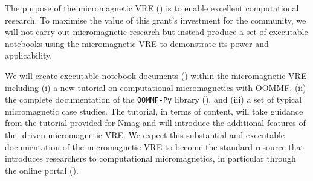 \begin{workpackage}
\begin{tasklist}
\begin{task}[lead=USO,title=Demonstrator: micromagnetic VRE notebooks,
  id=oommf-tutorial-and-documentation, PM=6, partners={SR,PS}]

  The purpose of the micromagnetic VRE
  () is to enable excellent
  computational research. To maximise the value of this grant's investment for the
  community, we will not carry out micromagnetic research but instead
  produce a set of executable notebooks using the micromagnetic VRE
  to demonstrate its power and applicability.

  We will create executable notebook documents
  () within the micromagnetic VRE
  including (i) a new tutorial on computational micromagnetics with
  OOMMF, (ii) the complete documentation of the \texttt{OOMMF-Py}
  library (),
  and (iii) a set of typical micromagnetic case studies. The tutorial,
  in terms of content, will take guidance from the tutorial provided
  for Nmag \cite{Nmag-tutorial-url} and will introduce the additional
  features of the \Jupyter-driven micromagnetic VRE. We expect this
  substantial and executable documentation of the micromagnetic VRE to
  become the standard resource that introduces researchers to
  computational micromagnetics, in particular through the online
  portal ().



\end{task}
\end{tasklist}
\end{workpackage}

